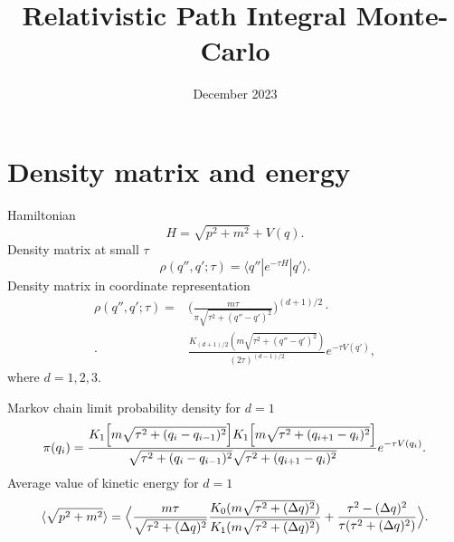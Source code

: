\documentclass{article}
\title{Relativistic Path Integral Monte-Carlo}
\date{December 2023}
\begin{document}
\maketitle

\section{Density matrix and energy}
	Hamiltonian
	\begin{equation}
		H = \sqrt{p ^ 2 + m ^ 2} + V(q).
		\label{Main Hamiltonian}
	\end{equation}
	Density matrix at small $\tau$
	\begin{equation}
		\rho (q '', q'; \tau) = \langle q '' | e ^ {- \tau H} | q ' \rangle.
	\end{equation}
	Density matrix in coordinate representation
	\begin{align}
		\nonumber
		\rho (q '', q'; \tau) =& \Biggl ( \frac{m \tau}{\pi \sqrt{\tau ^ 2 + (q '' - q ') ^ 2}} \Biggr ) ^ {(d + 1) / 2} \cdot \\
    	\cdot& \frac{K _ {(d + 1) / 2} (m \sqrt{\tau ^ 2 + (q '' - q ') ^ 2})}{(2 \tau) ^ {(d - 1) / 2}} e ^ {- \tau V (q ')},
    	\label{Density Matrix General}
	\end{align}
	where $d = 1, 2, 3$.

	Markov chain limit probability density for $d = 1$
	\begin{equation}
 		\pi (q _ i) = \frac{K _ 1 \Bigl [ m \sqrt{\tau ^ 2 + (q _ i - q _ {i - 1}) ^ 2} \Bigr ] K _ 1 \Bigl [ m \sqrt{\tau ^ 2 + (q _ {i + 1} - q _ i) ^ 2} \Bigr ]}{\sqrt{\tau ^ 2 + (q _ i - q _ {i - 1}) ^ 2} \sqrt{\tau ^ 2 + (q _ {i + 1} - q _ i) ^ 2}} e ^ {-\tau V(q _ i)}.
 		\label{MCLPD d = 1}
	\end{equation}
	Average value of kinetic energy for $d = 1$
	\begin{equation}
		\langle \sqrt{p ^ 2 + m ^ 2} \rangle = \Bigl \langle \frac{m \tau}{\sqrt{\tau ^ 2 + (\Delta q) ^ 2}} \frac{K _ 0 (m \sqrt{\tau ^ 2 + (\Delta q) ^ 2})}{K _ 1 (m \sqrt{\tau ^ 2 + (\Delta q) ^ 2})} + \frac{\tau ^ 2 - (\Delta q) ^ 2}{\tau (\tau ^ 2 + (\Delta q) ^ 2)} \Bigr \rangle.
		\label{Kinetic Energy d = 1}
	\end{equation}
\end{document}
